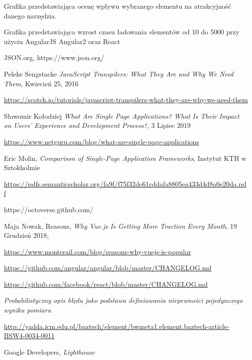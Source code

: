 \cleardoublepage
{}
{}


\begin{thebibliography}{99}

  Grafika przedstawiająca ocenę wpływu wybranego elementu na atrakcyjność danego narzędzia.

  Grafika przedstawiająca wzrost czasu ładowania elementów od 10 do 5000 przy użyciu AngularJS Angular2 oraz React


   JSON.org, https://www.json.org/
  
  Peleke Sengstacke
 \emph{JavaScript Transpilers: What They Are and Why We Need Them},
  Kwiecień 25, 2016

\url{https://scotch.io/tutorials/javascript-transpilers-what-they-are-why-we-need-them}

Sławomir Kołodziej
\emph{What Are Single Page Applications? What Is Their Impact on Users’ Experience and Development Process?},
3 Lipiec 2019

\url{https://www.netguru.com/blog/what-are-single-page-applications}

Eric Molin, 
\emph{Comparison of Single-Page Application Frameworks},
Instytut KTH w  Sztokholmie

\url{https://pdfs.semanticscholar.org/fa9f/f75f32de61cddafa8805ea433d4d8a0e20da.pdf}

https://octoverse.github.com/

Maja Nowak, Reasons,
\emph{Why Vue.js Is Getting More Traction Every Month},
19 Grudzień 2018, 

\url{https://www.monterail.com/blog/reasons-why-vuejs-is-popular}


\url{https://github.com/angular/angular/blob/master/CHANGELOG.md}

 
\url{https://github.com/facebook/react/blob/master/CHANGELOG.md}

\emph{Probabilistyczny opis błędu jako podstawa definiowania niepewności pojedynczego wyniku pomiaru}

\url{http://yadda.icm.edu.pl/baztech/element/bwmeta1.element.baztech-article-BSW4-0034-0011}

Google Developers,
\emph{Lighthouse}


\end{thebibliography}
